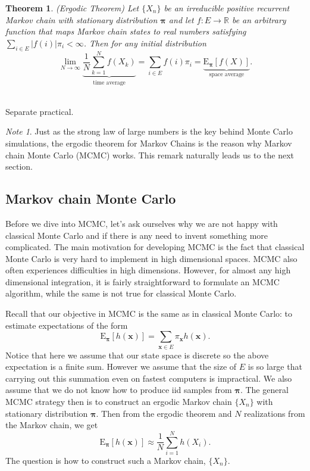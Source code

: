 \documentclass[11pt]{article}\usepackage[]{graphicx}\usepackage[]{color}
\numberwithin{algorithm}{section}
\newtheorem*{theorem}{Theorem}
\theoremstyle{remark}
\newtheorem*{mynote}{Note}
\theoremstyle{definition}
\newenvironment{example}[1]{\begin{trivlist}
\item[\hskip \labelsep {\bfseries Example}: \underline{#1}]\ \\}{\end{trivlist}}
\begin{document}
\begin{theorem}{(Ergodic Theorem)}
  Let $\{X_n\}$ be an irreducible positive recurrent Markov chain with stationary distribution 
  $\boldsymbol{\pi}$ and let $f: E \rightarrow \mathbb{R}$ be an arbitrary function that maps Markov chain
  states to real numbers satisfying $\sum_{i \in E} |f(i)| \pi_i < \infty$. Then for any initial distribution
  \begin{equation*}
    \lim_{N \rightarrow \infty}\underbrace{\frac{1}{N}\sum_{k=1}^N f(X_k)}_{\text{time average}} 
    = \sum_{i \in E} f(i) \pi_i = \underbrace{\text{E}_{\boldsymbol{\pi}}[f(X)]}_{\text{space average}}.
  \end{equation*}
\end{theorem}

\begin{example}{Ehrenfest model of diffusion (continued)}
Separate practical.
\end{example}

\begin{mynote}
  Just as the strong law of large numbers is the key behind Monte Carlo
  simulations, the ergodic theorem for Markov Chains is the reason why Markov chain Monte Carlo (MCMC) works.
  This remark naturally leads us to the next section.
\end{mynote}


\subsection{Markov chain Monte Carlo}
Before we dive into MCMC, let's ask ourselves why we are not happy with classical Monte Carlo and if there is 
any need to invent something more complicated. The main motivation for developing MCMC is the fact 
that classical Monte Carlo is very hard to implement in high dimensional spaces. MCMC also often 
experiences difficulties in high dimensions. However, for almost any high dimensional integration, it is fairly
straightforward to formulate an MCMC algorithm, while the same is not true for classical Monte Carlo.
\par
Recall that our objective in MCMC is the same as in classical Monte Carlo: to estimate expectations of 
the form
\begin{equation*}
  \text{E}_{\boldsymbol{\pi}}[h(\mathbf{x})] = \sum_{\boldsymbol{x} \in E} \pi_{\boldsymbol{x}} h(\mathbf{x}).
\end{equation*}
Notice that here we assume that our state space is discrete so the above expectation is a finite sum.
However we assume that the size of $E$ is so large that carrying out this summation even on fastest computers
is impractical. We also assume that we do not know how to produce iid samples from $\boldsymbol{\pi}$.
The general MCMC strategy then is to construct an ergodic Markov chain $\{X_n\}$
with stationary distribution $\boldsymbol{\pi}$. Then from the ergodic theorem and $N$ realizations from
the Markov chain, we get
\begin{equation*}
  \text{E}_{\boldsymbol{\pi}}[h(\mathbf{x})] \approx \frac{1}{N} \sum_{i = 1}^N h(X_i).
\end{equation*}
The question is how to construct such a Markov chain, $\{X_n\}$.
\end{document}

